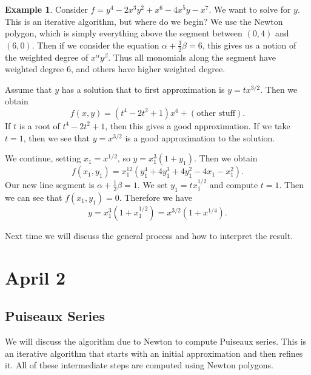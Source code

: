 \documentclass[leqno, openany]{memoir}
\theoremstyle{definition}
\newtheorem{exm}[thm]{Example}
\theoremstyle{remark}
\theoremstyle{plain}
\theoremstyle{definition}
\theoremstyle{remark}
\begin{document}
\begin{exm}
    Consider $f = y^4 - 2x^3y^2 + x^6 - 4x^5y - x^7$. We want to solve for $y$. This is an iterative algorithm, but where do we begin? We use the Newton polygon, which is simply everything above the segment between $(0,4)$ and $(6,0)$. Then if we consider the equation $\alpha + \frac{3}{2} \beta = 6$, this gives us a notion of the weighted degree of $x^{\alpha}y^{\beta}$. Thus all monomials along the segment have weighted degree $6$, and others have higher weighted degree. 

    Assume that $y$ has a solution that to first approximation is $y = tx^{3/2}$. Then we obtain
    \[ f(x,y) = (t^4 - 2t^2 + 1)x^6 + (\text{other stuff}). \]
    If $t$ is a root of $t^4-2t^2+1$, then this gives a good approximation. If we take $t=1$, then we see that $y=x^{3/2}$ is a good approximation to the solution.

    We continue, setting $x_1 = x^{1/2}$, so $y = x_1^3(1 + y_1)$. Then we obtain
    \[ f(x_1, y_1) = x_1^{12}(y_1^4 + 4y_1^3 + 4y_1^2 - 4x_1 - x_1^2). \]
    Our new line segment is $\alpha + \frac{1}{2} \beta = 1$. We set $y_1 = tx_1^{1/2}$ and compute $t = 1$. Then we can see that $f(x_1, y_1) = 0$. Therefore we have 
    \[ y = x_1^3(1+x_1^{1/2}) = x^{3/2}(1+x^{1/4}). \]
\end{exm}

Next time we will discuss the general process and how to interpret the result.

\chapter{April 2}%
\label{cha:april_2}

\section{Puiseaux Series}%
\label{sec:links_of_plane_curve_singularities}

We will discuss the algorithm due to Newton to compute Puiseaux series. This is an iterative algorithm that starts with an initial approximation and then refines it. All of these intermediate steps are computed using Newton polygons.
\end{document}

